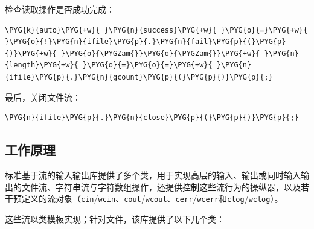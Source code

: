 
检查读取操作是否成功完成：



\begin{codeblockbg}
\begin{Verbatim}[commandchars=\\\{\},breaklines=true,breakanywhere=true,fontsize=\codefont,xleftmargin=17bp]
\PYG{k}{auto}\PYG{+w}{ }\PYG{n}{success}\PYG{+w}{ }\PYG{o}{=}\PYG{+w}{ }\PYG{o}{!}\PYG{n}{ifile}\PYG{p}{.}\PYG{n}{fail}\PYG{p}{(}\PYG{p}{)}\PYG{+w}{ }\PYG{o}{\PYGZam{}}\PYG{o}{\PYGZam{}}\PYG{+w}{ }\PYG{n}{length}\PYG{+w}{ }\PYG{o}{=}\PYG{o}{=}\PYG{+w}{ }\PYG{n}{ifile}\PYG{p}{.}\PYG{n}{gcount}\PYG{p}{(}\PYG{p}{)}\PYG{p}{;}
\end{Verbatim}
\end{codeblockbg}



最后，关闭文件流：



\begin{codeblockbg}
\begin{Verbatim}[commandchars=\\\{\},breaklines=true,breakanywhere=true,fontsize=\codefont,xleftmargin=17bp]
\PYG{n}{ifile}\PYG{p}{.}\PYG{n}{close}\PYG{p}{(}\PYG{p}{)}\PYG{p}{;}
\end{Verbatim}
\end{codeblockbg}



\subsection{工作原理}



标准基于流的输入输出库提供了多个类，用于实现高层的输入、输出或同时输入输出的文件流、字符串流与字符数组操作，还提供控制这些流行为的操纵器，以及若干预定义的流对象（\texttt{cin}/\texttt{wcin}、\texttt{cout}/\texttt{wcout}、\texttt{cerr}/\texttt{wcerr}和\texttt{clog}/\texttt{wclog}）。



这些流以类模板实现；针对文件，该库提供了以下几个类：



